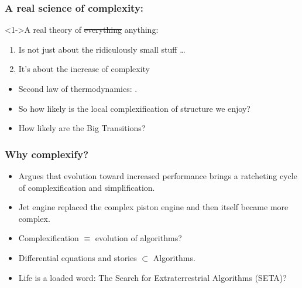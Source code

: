 \begin{frame}

  \frametitle{A real science of complexity:}

  \begin{block}<1->{A real theory of \sout{everything} anything:}
    \begin{enumerate}
    \item<2->
      Is not just about the ridiculously small stuff \ldots
    \item<3->
      It's about the increase of complexity
    \end{enumerate}
  \end{block}

  \medskip

  \begin{block}{}
  \end{block}

  \medskip

  \begin{block}{}
  \begin{itemize}
  \item<5-> 
    Second law of thermodynamics: .
  \item<6-> 
    So how likely is the local complexification of structure we enjoy?
  \item<7-> 
    How likely are the Big Transitions?
  \end{itemize}
  \end{block}

\end{frame}

\begin{frame}
  \frametitle{Why complexify?}

  \begin{block}{}
    \begin{itemize}
    \item<+-> 
      Argues that evolution toward increased performance brings a
      ratcheting cycle
      of complexification and simplification.
    \item<+-> 
      Jet engine replaced the complex piston engine and then itself
      became more complex.
    \item<+-> 
      Complexification $\equiv$ evolution of algorithms?
    \item<+->  
      Differential equations and stories $\subset$ Algorithms.
    \item<+->  
      Life is a loaded word: The Search for Extraterrestrial Algorithms (SETA)?
    \end{itemize}
  \end{block}
  
\end{frame}

